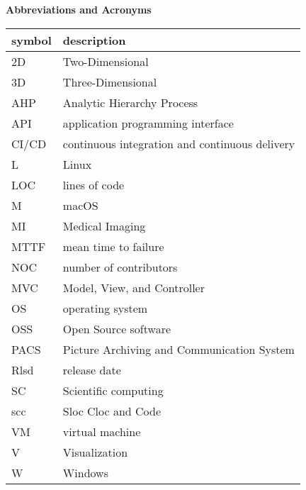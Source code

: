 \begin{center}
\textbf{\large Abbreviations and Acronyms}
\end{center}

\begin{table}[H]
\centering
\begin{tabular}{ll} 
\hline
\textbf{symbol} & \textbf{description}\\
\hline		
2D & Two-Dimensional\\
3D & Three-Dimensional\\
AHP & Analytic Hierarchy Process\\
API & application programming interface\\
CI/CD & continuous integration and continuous delivery\\
L & Linux \\
LOC & lines of code\\
M & macOS\\
MI & Medical Imaging\\
MTTF & mean time to failure\\
NOC &  number of contributors\\
MVC & Model, View, and Controller\\
OS & operating system\\
OSS & Open Source software\\
PACS & Picture Archiving and Communication System\\
Rlsd & release date\\
SC & Scientific computing\\
scc & Sloc Cloc and Code\\
VM & virtual machine\\
V & Visualization\\
W & Windows\\
\hline		
\end{tabular}\\
\end{table}
